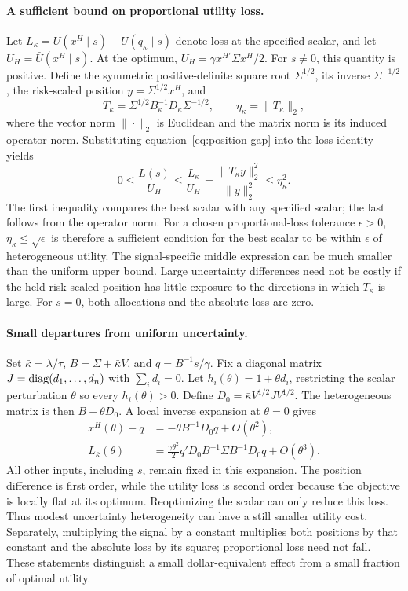 \paragraph{A sufficient bound on proportional utility loss.}
Let $L_\kappa=\bar U(x^H\mid s)-\bar U(q_\kappa\mid s)$ denote loss at the specified scalar, and let $U_H=\bar U(x^H\mid s)$. At the optimum, $U_H=\gamma x^{H\prime}\Sigma x^H/2$. For $s\ne0$, this quantity is positive. Define the symmetric positive-definite square root $\Sigma^{1/2}$, its inverse $\Sigma^{-1/2}$, the risk-scaled position $y=\Sigma^{1/2}x^H$, and
\begin{equation}
T_\kappa=\Sigma^{1/2}B_\kappa^{-1}D_\kappa\Sigma^{-1/2},
\qquad \eta_\kappa=\|T_\kappa\|_2,
\end{equation}
where the vector norm $\|\cdot\|_2$ is Euclidean and the matrix norm is its induced operator norm. Substituting equation~\eqref{eq:position-gap} into the loss identity yields
\begin{equation}
0\leq\frac{L(s)}{U_H}\leq\frac{L_\kappa}{U_H}
 =\frac{\|T_\kappa y\|_2^2}{\|y\|_2^2}
 \leq\eta_\kappa^2.
\label{eq:scalar-bound}
\end{equation}
The first inequality compares the best scalar with any specified scalar; the last follows from the operator norm. For a chosen proportional-loss tolerance $\epsilon>0$, $\eta_\kappa\leq\sqrt{\epsilon}$ is therefore a sufficient condition for the best scalar to be within $\epsilon$ of heterogeneous utility. The signal-specific middle expression can be much smaller than the uniform upper bound. Large uncertainty differences need not be costly if the held risk-scaled position has little exposure to the directions in which $T_\kappa$ is large. For $s=0$, both allocations and the absolute loss are zero.

\paragraph{Small departures from uniform uncertainty.}
Set $\bar\kappa=\lambda/\tau$, $B=\Sigma+\bar\kappa V$, and $q=B^{-1}s/\gamma$. Fix a diagonal matrix $J=\operatorname{diag}(d_1,\ldots,d_n)$ with $\sum_i d_i=0$. Let $h_i(\theta)=1+\theta d_i$, restricting the scalar perturbation $\theta$ so every $h_i(\theta)>0$. Define $D_0=\bar\kappa V^{1/2}JV^{1/2}$. The heterogeneous matrix is then $B+\theta D_0$. A local inverse expansion at $\theta=0$ gives
\begin{align}
x^H(\theta)-q&=-\theta B^{-1}D_0q+O(\theta^2),\\
L_{\bar\kappa}(\theta)
&=\frac{\gamma\theta^2}{2}
q'D_0B^{-1}\Sigma B^{-1}D_0q+O(\theta^3).
\label{eq:local-loss}
\end{align}
All other inputs, including $s$, remain fixed in this expansion. The position difference is first order, while the utility loss is second order because the objective is locally flat at its optimum. Reoptimizing the scalar can only reduce this loss. Thus modest uncertainty heterogeneity can have a still smaller utility cost. Separately, multiplying the signal by a constant multiplies both positions by that constant and the absolute loss by its square; proportional loss need not fall. These statements distinguish a small dollar-equivalent effect from a small fraction of optimal utility.

